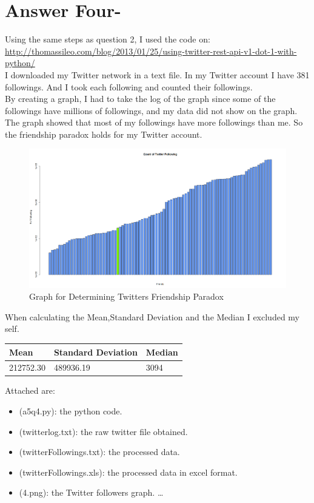 \documentclass[letterpaper,11pt]{article}
\begin{document}
\pagebreak
\section*{Answer Four-}
Using the same steps as question 2, I used the code on:\\

\url{http://thomassileo.com/blog/2013/01/25/using-twitter-rest-api-v1-dot-1-with-python/}\\

I downloaded my Twitter network in a text file. In my Twitter account I have 381 followings. And I took each following and counted their followings.\\ 

By creating a graph, I had to take the log of the graph since some of the followings have millions of followings, and my data did not show on the graph.\\

The graph showed that most of my followings have more followings than me. So the friendship paradox holds for my Twitter account.


\begin{figure}[!ht]
\centering
\includegraphics[width=1\textwidth]{4.png}
\caption{Graph for Determining Twitters Friendship Paradox}
\label{fig:Graph for Determining Twitters Friendship Paradox}
\end{figure}


When calculating the Mean,Standard Deviation and the Median I excluded my self.

\begin{table}[H]
    \begin{tabular}{|| l || l || l ||}\hline
    Mean & Standard Deviation & Median \\\hline
    212752.30  & 489936.19 & 3094 \\\hline
    \end{tabular}
\end{table}

Attached are:
\begin{itemize}
\item (a5q4.py): the python code.
\item (twitterlog.txt): the raw twitter file obtained.
\item (twitterFollowings.txt): the processed data.
\item (twitterFollowings.xls): the processed data in excel format.
\item (4.png): the Twitter followers graph.
\ldots
\end{itemize}

\pagebreak
\end{document}
